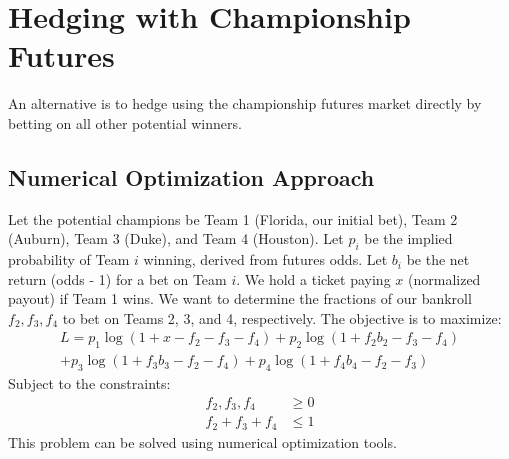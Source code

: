 \documentclass{article}
\begin{document}
\section{Hedging with Championship Futures}

An alternative is to hedge using the championship futures market directly by betting on all other potential winners.

\subsection{Numerical Optimization Approach}

Let the potential champions be Team 1 (Florida, our initial bet), Team 2 (Auburn), Team 3 (Duke), and Team 4 (Houston). Let $p_i$ be the implied probability of Team $i$ winning, derived from futures odds. Let $b_i$ be the net return (odds - 1) for a bet on Team $i$. We hold a ticket paying $x$ (normalized payout) if Team 1 wins. We want to determine the fractions of our bankroll $f_2, f_3, f_4$ to bet on Teams 2, 3, and 4, respectively. The objective is to maximize:
\begin{multline} \label{eq:logutil_futures}
L = p_1 \log(1 + x - f_2 - f_3 - f_4) + p_2 \log(1 + f_2 b_2 - f_3 - f_4) \\
+ p_3 \log(1 + f_3 b_3 - f_2 - f_4) + p_4 \log(1 + f_4 b_4 - f_2 - f_3)
\end{multline}
Subject to the constraints:
\begin{align*}
    f_2, f_3, f_4 &\ge 0 \\
    f_2 + f_3 + f_4 &\le 1 
\end{align*}
This problem can be solved using numerical optimization tools.
\end{document}
